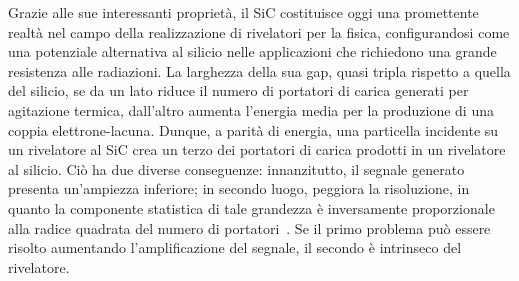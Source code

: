 Grazie alle sue interessanti proprietà, il SiC costituisce oggi una promettente realtà nel campo della realizzazione di rivelatori per la fisica, configurandosi come una potenziale alternativa al silicio nelle applicazioni che richiedono una grande resistenza alle radiazioni.
%
La larghezza della sua gap, quasi tripla rispetto a quella del silicio, se da un lato riduce il numero di portatori di carica generati per agitazione termica, dall'altro aumenta l'energia media per la produzione di una coppia elettrone-lacuna. 
%
Dunque, a parità di energia, una particella incidente su un rivelatore al SiC crea un terzo dei portatori di carica prodotti in un rivelatore al silicio.
Ciò ha due diverse conseguenze: innanzitutto, il segnale generato presenta un'ampiezza inferiore; in secondo luogo, peggiora la risoluzione, in quanto la componente statistica di tale grandezza è inversamente proporzionale alla radice quadrata del numero di portatori~\cite{knoll:10}.
Se il primo problema può essere risolto aumentando l'amplificazione del segnale, il secondo è intrinseco del rivelatore.
%
%
%
%

